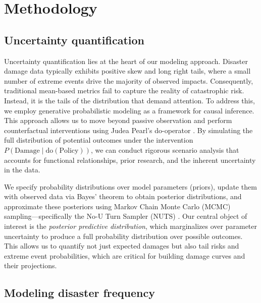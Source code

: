 
\section{Methodology}
\label{sec:methodology}

\subsection{Uncertainty quantification}

Uncertainty quantification lies at the heart of our modeling approach. Disaster damage data typically exhibits positive skew and long right tails, where a small number of extreme events drive the majority of observed impacts. Consequently, traditional mean-based metrics fail to capture the reality of catastrophic risk. Instead, it is the tails of the distribution that demand attention. To address this, we employ generative probabilistic modeling \citep{gelman1995bayesian} as a framework for causal inference. This approach allows us to move beyond passive observation and perform counterfactual interventions using Judea Pearl's do-operator \citep{pearl2009causality}. By simulating the full distribution of potential outcomes under the intervention $P(\text{Damage} \mid \text{do}(\text{Policy}))$, we can conduct rigorous scenario analysis that accounts for functional relationships, prior research, and the inherent uncertainty in the data.

We specify probability distributions over model parameters (priors), update them with observed data via Bayes' theorem to obtain posterior distributions, and approximate these posteriors using Markov Chain Monte Carlo (MCMC) sampling---specifically the No-U Turn Sampler (NUTS) \citep{hoffman2014no}. Our central object of interest is the \textit{posterior predictive distribution}, which marginalizes over parameter uncertainty to produce a full probability distribution over possible outcomes. This allows us to quantify not just expected damages but also tail risks and extreme event probabilities, which are critical for building damage curves and their projections.

\subsection{Modeling disaster frequency}

